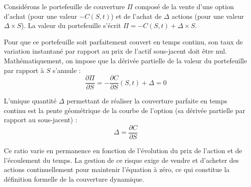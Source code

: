 Considérons le portefeuille de couverture $\Pi$ composé de la vente d'une option d'achat (pour une valeur $-C(S,t)$) et de l'achat de $\Delta$ actions (pour une valeur $\Delta \times S$). La valeur du portefeuille s'écrit $\Pi = -C(S,t) + \Delta \times S$.

Pour que ce portefeuille soit parfaitement couvert en temps continu, son taux de variation instantané par rapport au prix de l'actif sous-jacent doit être nul. Mathématiquement, on impose que la dérivée partielle de la valeur du portefeuille par rapport à $S$ s'annule :
\begin{equation}
    \label{eq:fsec3-derivee_portefeuille}
    \frac{\partial \Pi}{\partial S} = -\frac{\partial C}{\partial S}(S, t) + \Delta = 0
\end{equation}

\begin{definitionbox}
L'unique quantité $\Delta$ permettant de réaliser la couverture parfaite en temps continu est la pente géométrique de la courbe de l'option (sa dérivée partielle par rapport au sous-jacent) :
\begin{equation}
    \label{eq:fsec3-delta_continu}
    \Delta = \frac{\partial C}{\partial S}
\end{equation}
\end{definitionbox}

Ce ratio varie en permanence en fonction de l'évolution du prix de l'action et de l'écoulement du temps. La gestion de ce risque exige de vendre et d'acheter des actions continuellement pour maintenir l'équation à zéro, ce qui constitue la définition formelle de la couverture dynamique.